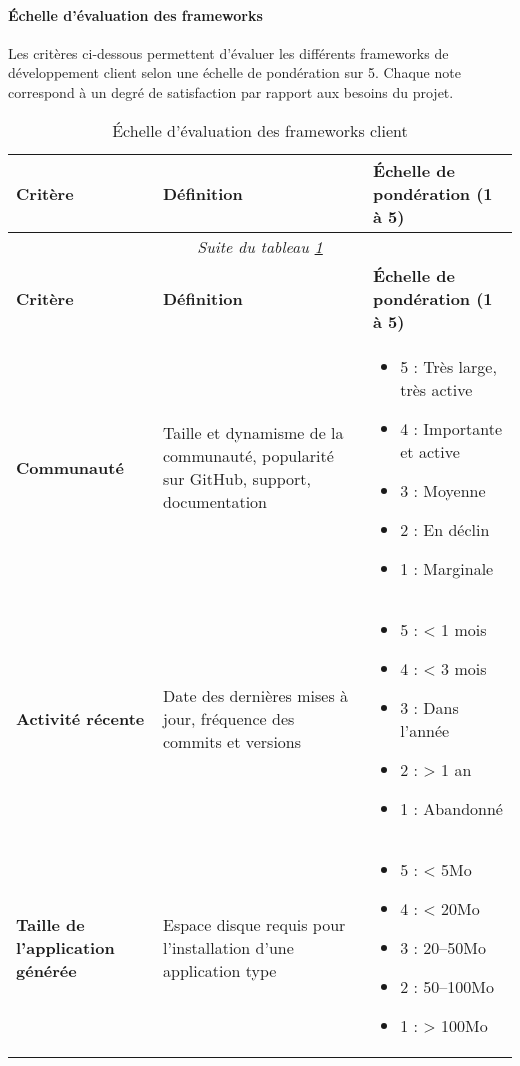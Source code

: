 \paragraph{Échelle d’évaluation des frameworks} \label{sec:criteria_frameworks}

Les critères ci-dessous permettent d’évaluer les différents frameworks de développement client selon une échelle de pondération sur 5.
Chaque note correspond à un degré de satisfaction par rapport aux besoins du projet.

\begin{longtable}{|p{}|p{}|p{}|}
\caption{\label{tab:echelle_frameworks} Échelle d’évaluation des frameworks client} \\
\hline
\textbf{Critère} & \textbf{Définition} & \textbf{Échelle de pondération (1 à 5)} \\
\hline
\endfirsthead

\multicolumn{3}{c}{\textit{Suite du tableau \ref{tab:echelle_frameworks}}} \\
\hline
\textbf{Critère} & \textbf{Définition} & \textbf{Échelle de pondération (1 à 5)} \\
\hline
\endhead

\textbf{Communauté} & Taille et dynamisme de la communauté, popularité sur GitHub, support, documentation & 
\begin{itemize}
    \item 5 : Très large, très active
    \item 4 : Importante et active
    \item 3 : Moyenne
    \item 2 : En déclin
    \item 1 : Marginale
\end{itemize} \\
\hline

\textbf{Activité récente} & Date des dernières mises à jour, fréquence des commits et versions & 
\begin{itemize}
    \item 5 : < 1 mois
    \item 4 : < 3 mois
    \item 3 : Dans l’année
    \item 2 : > 1 an
    \item 1 : Abandonné
\end{itemize} \\
\hline

\textbf{Taille de l’application générée} & Espace disque requis pour l’installation d’une application type & 
\begin{itemize}
    \item 5 : < 5Mo
    \item 4 : < 20Mo
    \item 3 : 20–50Mo
    \item 2 : 50–100Mo
    \item 1 : > 100Mo
\end{itemize} \\
\hline


\end{longtable}

